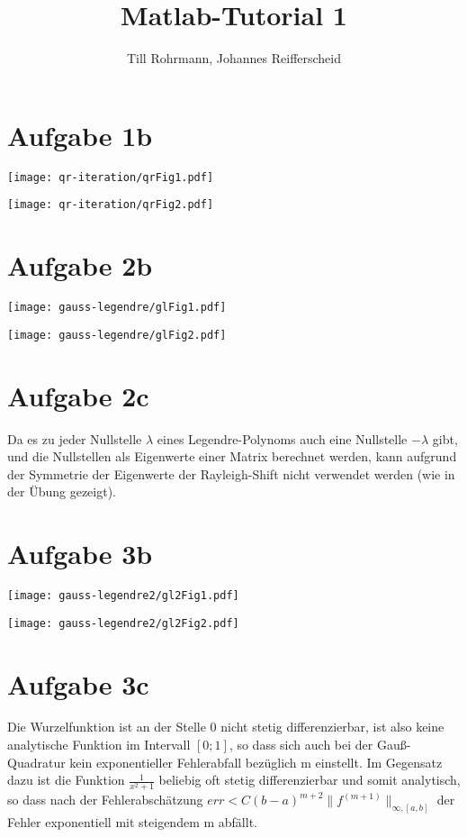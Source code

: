 \documentclass[german]{article}
\author{Till Rohrmann, Johannes Reifferscheid}
\title{
	Matlab-Tutorial 1
}
\begin{document}
	\maketitle
 
    \section{Aufgabe 1b}
    
      \texttt{[image: qr-iteration/qrFig1.pdf]}
      
      \texttt{[image: qr-iteration/qrFig2.pdf]}
 
    \section{Aufgabe 2b}

      \texttt{[image: gauss-legendre/glFig1.pdf]}
      
      \texttt{[image: gauss-legendre/glFig2.pdf]}

	\section{Aufgabe 2c}

	Da es zu jeder Nullstelle $\lambda$ eines Legendre-Polynoms auch eine Nullstelle $-\lambda$ gibt, und die Nullstellen als Eigenwerte einer Matrix berechnet werden, kann aufgrund der Symmetrie der Eigenwerte der Rayleigh-Shift nicht verwendet werden (wie in der Übung gezeigt).

	\section{Aufgabe 3b}

      \texttt{[image: gauss-legendre2/gl2Fig1.pdf]}
      
      \texttt{[image: gauss-legendre2/gl2Fig2.pdf]}

	\section{Aufgabe 3c}

	Die Wurzelfunktion ist an der Stelle 0 nicht stetig differenzierbar, ist also keine analytische Funktion im Intervall $[0;1]$, so dass sich auch bei der Gauß-Quadratur kein exponentieller Fehlerabfall bezüglich m einstellt. Im Gegensatz dazu ist die Funktion $\frac{1}{x^2+1}$ beliebig oft stetig differenzierbar und somit analytisch, so dass nach der Fehlerabschätzung $err < C (b-a)^{m+2} \|f^{(m+1)}\|_{\infty,[a,b]}$ der Fehler exponentiell mit steigendem m abfällt.
  
\end{document}
